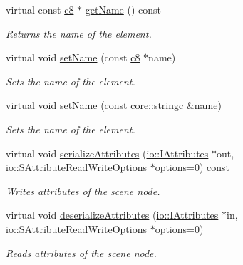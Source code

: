 \begin{DoxyCompactItemize}
virtual const \hyperlink{namespaceirr_a9395eaea339bcb546b319e9c96bf7410}{c8} $\ast$ \hyperlink{classirr_1_1gui_1_1IGUIElement_a308fa8bc16580d53df5c65ded0c1349b}{get\+Name} () const
\begin{DoxyCompactList}\small\item\em Returns the name of the element. \end{DoxyCompactList}\item 
virtual void \hyperlink{classirr_1_1gui_1_1IGUIElement_a47ce14d1a973137b6cbe91a047df2ebe}{set\+Name} (const \hyperlink{namespaceirr_a9395eaea339bcb546b319e9c96bf7410}{c8} $\ast$name)
\begin{DoxyCompactList}\small\item\em Sets the name of the element. \end{DoxyCompactList}\item 
virtual void \hyperlink{classirr_1_1gui_1_1IGUIElement_a5e318b47fece6d4157a1d7ccf401f1c8}{set\+Name} (const \hyperlink{namespaceirr_1_1core_ade1071a878633f2f6d8a75c5d11fec19}{core\+::stringc} \&name)
\begin{DoxyCompactList}\small\item\em Sets the name of the element. \end{DoxyCompactList}\item 
virtual void \hyperlink{classirr_1_1gui_1_1IGUIElement_ac575f2f817b05733dbc667ff298f6e78}{serialize\+Attributes} (\hyperlink{classirr_1_1io_1_1IAttributes}{io\+::\+I\+Attributes} $\ast$out, \hyperlink{structirr_1_1io_1_1SAttributeReadWriteOptions}{io\+::\+S\+Attribute\+Read\+Write\+Options} $\ast$options=0) const
\begin{DoxyCompactList}\small\item\em Writes attributes of the scene node. \end{DoxyCompactList}\item 
virtual void \hyperlink{classirr_1_1gui_1_1IGUIElement_af71b96163b8d95816cd9c80fbf413b4d}{deserialize\+Attributes} (\hyperlink{classirr_1_1io_1_1IAttributes}{io\+::\+I\+Attributes} $\ast$in, \hyperlink{structirr_1_1io_1_1SAttributeReadWriteOptions}{io\+::\+S\+Attribute\+Read\+Write\+Options} $\ast$options=0)
\begin{DoxyCompactList}\small\item\em Reads attributes of the scene node. \end{DoxyCompactList}\end{DoxyCompactItemize}
